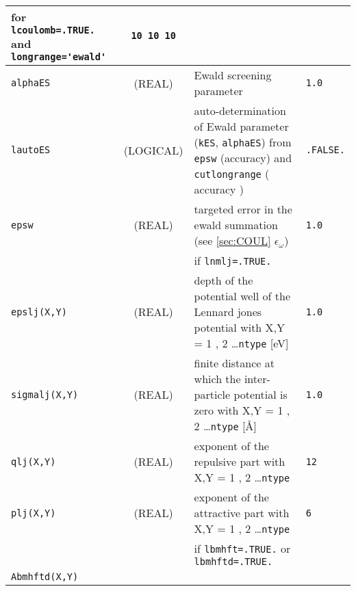 \documentclass[a4paper,8pt]{article}
\begin{document}
\begin{longtable}{l|c|m{8cm}|m{2cm}}
					 for \verb?lcoulomb=.TRUE.? and \verb?longrange='ewald'?  \newline                  & \verb?10 10 10? \\
\hline
\rule[-0.75cm]{0cm}{1.5cm}
\verb?alphaES?   &  (REAL)            & Ewald screening parameter                                                           & \verb?1.0? \\
\hline
\rule[-0.75cm]{0cm}{1.5cm}
\verb?lautoES?   & (LOGICAL)          & auto-determination of Ewald parameter (\verb?kES?, \verb?alphaES?) 
                                        from \verb?epsw? (accuracy) and \verb?cutlongrange? ( accuracy )                    & \verb?.FALSE.? \\
\hline
\rule[-0.75cm]{0cm}{1.5cm}
\verb?epsw?      &  (REAL)            & targeted error in the ewald summation (see \ref{sec:COUL} $\epsilon_\omega$) 
                                                                                                                            & \verb?1.0? \\
\hline
\hline
\rule[-0.75cm]{0cm}{1.5cm}
                 &                    & if \verb?lnmlj=.TRUE.?                                                              & \\
\hline
\rule[-0.75cm]{0cm}{1.5cm}
\verb?epslj(X,Y)?& (REAL)             & depth of the potential well of the Lennard jones potential 
                                        with X,Y = 1 , 2 \ldots \verb?ntype? [eV]                                           & \verb?1.0? \tabularnewline
\hline
\rule[-0.75cm]{0cm}{1.5cm}
\verb?sigmalj(X,Y)?          
                 & (REAL)             & finite distance at which the inter-particle potential is zero with 
                                          X,Y = 1 , 2 \ldots \verb?ntype? [\AA]                                             & \verb?1.0? \\
\hline
\rule[-0.75cm]{0cm}{1.5cm}
\verb?qlj(X,Y)?  & (REAL)             & exponent of the repulsive part with X,Y = 1 , 2 \ldots \verb?ntype?                 & \verb?12? \\
\hline
\rule[-0.75cm]{0cm}{1.5cm}
\verb?plj(X,Y)?  & (REAL)             & exponent of the attractive part with X,Y = 1 , 2 \ldots \verb?ntype?                & \verb?6? \\
\hline
\hline
\rule[-0.75cm]{0cm}{1.5cm}
                 &                    & if \verb?lbmhft=.TRUE.? or \verb?lbmhftd=.TRUE.?                                    & \\
\hline
\rule[-0.75cm]{0cm}{1.5cm}
\verb?Abmhftd(X,Y)?          

\end{longtable}
\end{document}
